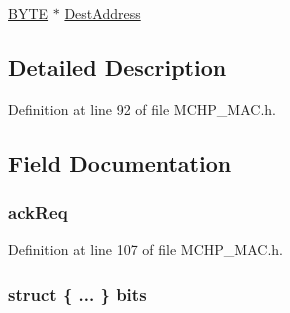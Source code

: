 \begin{DoxyCompactItemize}
\begin{tabbing}
\end{tabbing}\item 
\hyperlink{_generic_type_defs_8h_a4ae1dab0fb4b072a66584546209e7d58}{B\+Y\+T\+E} $\ast$ \hyperlink{struct_m_a_c___t_r_a_n_s___p_a_r_a_m_af1cebbe5b6b8e7f9d5a85d97a1dfbaa8}{Dest\+Address}
\end{DoxyCompactItemize}


\subsection{Detailed Description}


Definition at line 92 of file M\+C\+H\+P\+\_\+\+M\+A\+C.\+h.



\subsection{Field Documentation}
\hypertarget{struct_m_a_c___t_r_a_n_s___p_a_r_a_m_ad6d800fe3f8e6e8dba107e2c4df200c0}{}
\subsubsection[{ack\+Req}]{ ack\+Req}\label{struct_m_a_c___t_r_a_n_s___p_a_r_a_m_ad6d800fe3f8e6e8dba107e2c4df200c0}


Definition at line 107 of file M\+C\+H\+P\+\_\+\+M\+A\+C.\+h.

\hypertarget{struct_m_a_c___t_r_a_n_s___p_a_r_a_m_a2ca4211a4ceb3f3a1a96fb3e3f041dfc}{}
\subsubsection[{bits}]{\setlength{\rightskip}{0pt plus 5cm}struct \{ ... \}   bits}\label{struct_m_a_c___t_r_a_n_s___p_a_r_a_m_a2ca4211a4ceb3f3a1a96fb3e3f041dfc}
\hypertarget{struct_m_a_c___t_r_a_n_s___p_a_r_a_m_a8b58296433643a710f3f46f836b7254b}{}

